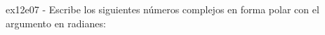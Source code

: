 \documentclass[spanish, 11pt]{exam}
\begin{document}
\begin{questions}
\begin{multicols}{2}
        \end{multicols}
        \question ex12e07 - Escribe los siguientes números complejos en forma polar con el argumento en radianes:
        \begin{multicols}{2} 
        \end{multicols}
        
    \end{questions}
    
\end{document}
